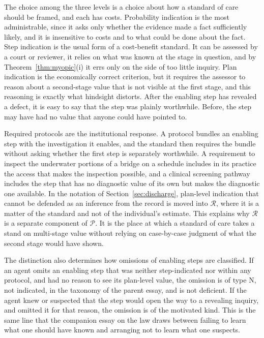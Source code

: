 \documentclass[11pt]{article}
\theoremstyle{plain}
\theoremstyle{definition}
\begin{document}
The choice among the three levels is a choice about how a standard of care should be framed, and each has costs. Probability indication is the most administrable, since it asks only whether the evidence made a fact sufficiently likely, and it is insensitive to costs and to what could be done about the fact. Step indication is the usual form of a cost-benefit standard. It can be assessed by a court or reviewer, it relies on what was known at the stage in question, and by Theorem~\ref{thm:myopic}(i) it errs only on the side of too little inquiry. Plan indication is the economically correct criterion, but it requires the assessor to reason about a second-stage value that is not visible at the first stage, and this reasoning is exactly what hindsight distorts. After the enabling step has revealed a defect, it is easy to say that the step was plainly worthwhile. Before, the step may have had no value that anyone could have pointed to.

Required protocols are the institutional response. A protocol bundles an enabling step with the investigation it enables, and the standard then requires the bundle without asking whether the first step is separately worthwhile. A requirement to inspect the underwater portions of a bridge on a schedule includes in its practice the access that makes the inspection possible, and a clinical screening pathway includes the step that has no diagnostic value of its own but makes the diagnostic one available. In the notation of Section~\ref{sec:discharge}, plan-level indication that cannot be defended as an inference from the record is moved into $\mathcal R$, where it is a matter of the standard and not of the individual's estimate. This explains why $\mathcal R$ is a separate component of $\mathcal P$. It is the place at which a standard of care takes a stand on multi-stage value without relying on case-by-case judgment of what the second stage would have shown.

The distinction also determines how omissions of enabling steps are classified. If an agent omits an enabling step that was neither step-indicated nor within any protocol, and had no reason to see its plan-level value, the omission is of type N, not indicated, in the taxonomy of the parent essay, and is not deficient. If the agent knew or suspected that the step would open the way to a revealing inquiry, and omitted it for that reason, the omission is of the motivated kind. This is the same line that the companion essay on the law \cite{flyxion2026law} draws between failing to learn what one should have known and arranging not to learn what one suspects.
\end{document}
